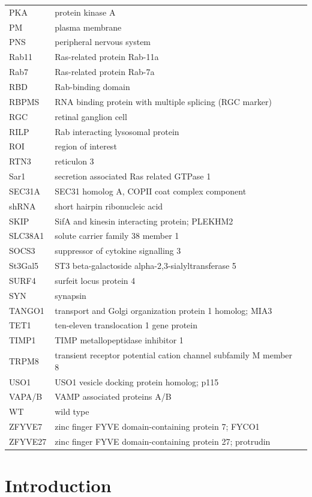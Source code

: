 \documentclass[
  12pt,
  a4paper,
]{book}
\begin{document}
\begin{longtable}[]{@{}
  >{\raggedright\arraybackslash}p{}
  >{\raggedright\arraybackslash}p{}@{}}
PKA & protein kinase A \\
PM & plasma membrane \\
PNS & peripheral nervous system \\
Rab11 & Ras-related protein Rab-11a \\
Rab7 & Ras-related protein Rab-7a \\
RBD & Rab-binding domain \\
RBPMS & RNA binding protein with multiple splicing (RGC marker) \\
RGC & retinal ganglion cell \\
RILP & Rab interacting lysosomal protein \\
ROI & region of interest \\
RTN3 & reticulon 3 \\
Sar1 & secretion associated Ras related GTPase 1 \\
SEC31A & SEC31 homolog A, COPII coat complex component \\
shRNA & short hairpin ribonucleic acid \\
SKIP & SifA and kinesin interacting protein; PLEKHM2 \\
SLC38A1 & solute carrier family 38 member 1 \\
SOCS3 & suppressor of cytokine signalling 3 \\
St3Gal5 & ST3 beta-galactoside alpha-2,3-sialyltransferase 5 \\
SURF4 & surfeit locus protein 4 \\
SYN & synapsin \\
TANGO1 & transport and Golgi organization protein 1 homolog; MIA3 \\
TET1 & ten-eleven translocation 1 gene protein \\
TIMP1 & TIMP metallopeptidase inhibitor 1 \\
TRPM8 & transient receptor potential cation channel subfamily M member 8~ \\
USO1 & USO1 vesicle docking protein homolog; p115 \\
VAPA/B & VAMP associated proteins A/B \\
WT & wild type \\
ZFYVE7 & zinc finger FYVE domain-containing protein 7; FYCO1 \\
ZFYVE27 & zinc finger FYVE domain-containing protein 27; protrudin \\
\bottomrule()
\end{longtable}

\hypertarget{INTRODUCTION}{%
\chapter*{Introduction}\label{INTRODUCTION}}
\end{document}
